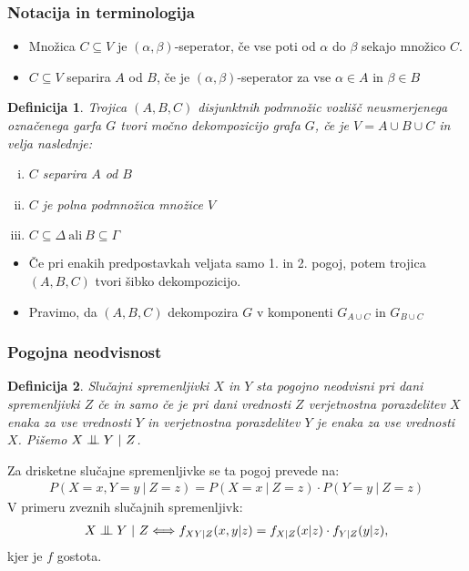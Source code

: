 \documentclass{beamer}
\newtheorem{definicija}{Definicija}
\newcommand{\cond}{\mathrel{\text{\scalebox{1.07}{$\perp\mkern-10mu\perp$}}}}
\begin{document}
\begin{frame}
    \frametitle{Notacija in terminologija}
    \begin{itemize}
        \item Množica $C \subseteq V $ je $ (\alpha, \beta)$-seperator, če vse poti od $\alpha$ do $\beta$ sekajo 
        množico $C$.
        \item $C \subseteq V $ separira $A$ od $B$, če je $ (\alpha, \beta)$-seperator za vse $\alpha \in A$
        in $\beta \in B$
    \end{itemize}
    \begin{definicija}
        Trojica $(A, B, C)$ disjunktnih podmnožic vozlišč neusmerjenega označenega garfa $G$ tvori
        močno dekompozicijo grafa $G$, če je $V = A \cup B \cup C$ in velja naslednje:
        \begin{enumerate}[(i)]
            \item $C$ separira $A$ od $B$
            \item $C$ je polna podmnožica množice $V$
            \item $C \subseteq \Delta ~ \text{ali} ~ B \subseteq \Gamma$
        \end{enumerate}
    \end{definicija}
    \begin{itemize}
        \item Če pri enakih predpostavkah veljata samo 1. in 2. pogoj, potem trojica  $(A, B, C)$
        tvori šibko dekompozicijo.
        \item Pravimo, da $(A, B, C)$ dekompozira $G$ v komponenti $G_{A \cup C}$ 
        in $G_{B \cup C} $
    \end{itemize}

\end{frame}
\begin{frame}
    \frametitle{Pogojna neodvisnost}
    \begin{definicija}
        Slučajni spremenljivki $X$ in $Y$ sta pogojno neodvisni pri dani spremenljivki
        $Z$  če in samo če je pri dani vrednosti $Z$ verjetnostna porazdelitev $X$ enaka
        za vse vrednosti $Y$ in verjetnostna porazdelitev $Y$ je enaka za vse vrednosti
        $X$. Pišemo $ X \cond Y ~|~ Z $. 
    \end{definicija}
    Za drisketne slučajne spremenljivke se ta pogoj prevede na: 
    \begin{align*}
         P(X=x, Y=y ~|~ Z=z) = P(X=x~|~Z=z) \cdot P(Y=y~|~Z=z) 
    \end{align*} 
    V primeru zveznih slučajnih spremenljivk:
    \begin{align*}
        X \cond Y ~|~ Z \Longleftrightarrow  f_{XY|Z} (x,y|z) = f_{X|Z} (x|z) \cdot f_{Y|Z} (y|z),
    \end{align*}
    kjer je $f$ gostota.
\end{frame}
\end{document}
